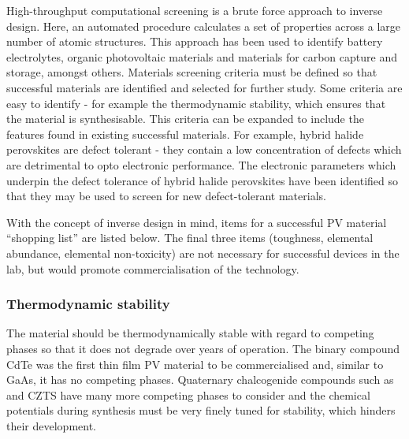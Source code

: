 High-throughput computational screening is a brute force approach to inverse design. Here, an automated procedure calculates a set of properties across a large number of atomic structures. This approach has been used to identify battery electrolytes,\autocite{Qu2015} organic photovoltaic materials\autocite{Hachmann2011} and materials for carbon capture and storage,\autocite{Dunstan2016} amongst others. 
Materials screening criteria must be defined so that successful materials are identified and selected for further study. Some criteria are easy to identify - for example the thermodynamic stability, which ensures that the material is synthesisable. This criteria can be expanded to include the features found in existing successful materials. For example, hybrid halide perovskites are defect tolerant - they contain a low concentration of defects which are detrimental to opto electronic performance. The electronic parameters which underpin the defect tolerance of hybrid halide perovskites have been identified so that they may be used to screen for new defect-tolerant materials.\autocite{Brandt2015} 

With the concept of inverse design in mind, items for a successful PV material ``shopping list'' are listed below. The final three items (toughness, elemental abundance, elemental non-toxicity) are not necessary for successful devices in the lab, but would promote commercialisation of the technology.

\subsubsection{Thermodynamic stability}
The material should be thermodynamically stable with regard to competing phases so that it does not degrade over years of operation. The binary compound CdTe was the first thin film PV material to be commercialised and, similar to GaAs, it has no competing phases. Quaternary chalcogenide compounds such as  and CZTS have many more competing phases to consider and the chemical potentials during synthesis must be very finely tuned for stability, which hinders their development.


